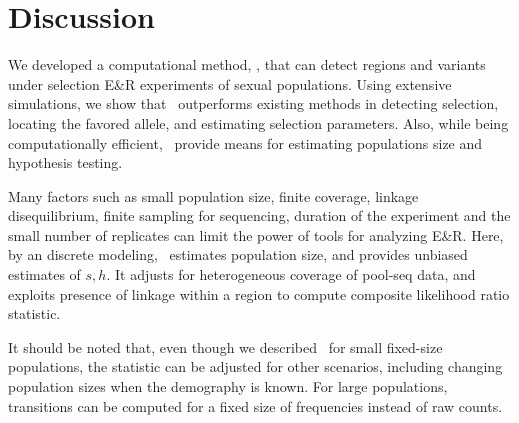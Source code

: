 \section{Discussion}
We developed a computational method, \comale, that can detect regions
and variants under selection E\&R experiments of sexual
populations. Using extensive simulations, we show that \comale\
outperforms existing methods in detecting selection, locating the
favored allele, and estimating selection parameters.  Also, while
being computationally efficient, \comale\ provide means for estimating
populations size and hypothesis testing.

Many factors such as small population size, finite coverage, linkage
disequilibrium, finite sampling for sequencing, duration of the
experiment and the small number of replicates can limit the power of
tools for analyzing E\&R.  Here, by an discrete modeling, \comale\
estimates population size, and provides unbiased estimates of
$s,h$. It adjusts for heterogeneous coverage of pool-seq data, and
exploits presence of linkage within a region to compute composite
likelihood ratio statistic.


It should be noted that, even though we described \comale\ for small
fixed-size populations, the statistic can be adjusted for other
scenarios, including changing population sizes when the demography is
known. For large populations, transitions can be computed for a fixed
size of frequencies instead of raw counts.




